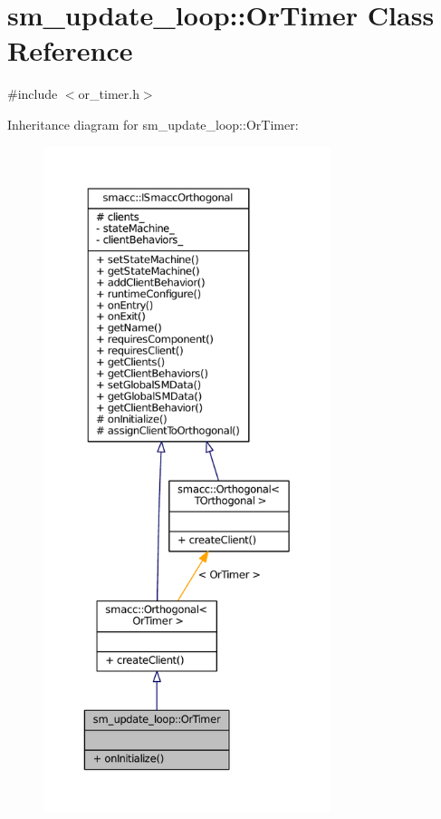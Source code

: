 \hypertarget{classsm__update__loop_1_1OrTimer}{}\section{sm\+\_\+update\+\_\+loop\+:\+:Or\+Timer Class Reference}
\label{classsm__update__loop_1_1OrTimer}


{\ttfamily \#include $<$or\+\_\+timer.\+h$>$}



Inheritance diagram for sm\+\_\+update\+\_\+loop\+:\+:Or\+Timer\+:
\nopagebreak
\begin{figure}[H]
\begin{center}
\leavevmode
\includegraphics[height=550pt]{classsm__update__loop_1_1OrTimer__inherit__graph}
\end{center}
\end{figure}


